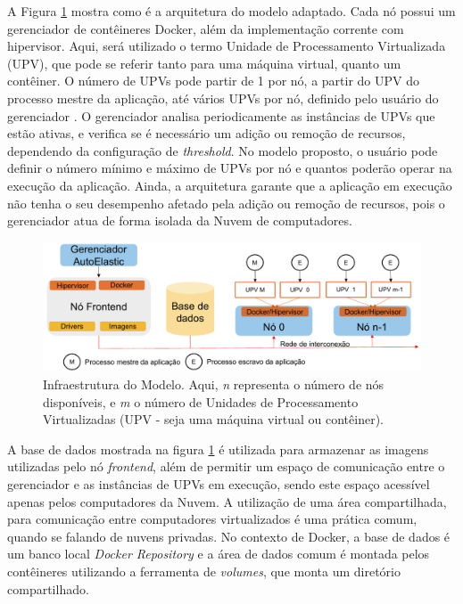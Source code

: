 \documentclass[twoside,english,brazilian]{UNISINOSartigo}
\begin{document}
A Figura \ref{fig:arquitetura} mostra como é a arquitetura do modelo adaptado. Cada nó possui um gerenciador de contêineres Docker, além da implementação corrente com hipervisor. Aqui, será utilizado o termo Unidade de Processamento Virtualizada (UPV), que pode se referir tanto para uma máquina virtual, quanto um contêiner. O número de UPVs pode partir de 1 por nó, a partir do UPV do processo mestre da aplicação, até vários UPVs por nó, definido pelo usuário do gerenciador \cite{6307065}. O gerenciador analisa periodicamente as instâncias de UPVs que estão ativas, e verifica se é necessário um adição ou remoção de recursos, dependendo da configuração de \textit{threshold}. No modelo proposto, o usuário pode definir o número mínimo e máximo de UPVs por nó e quantos poderão operar na execução da aplicação. Ainda, a arquitetura garante que a aplicação em execução não tenha o seu desempenho afetado pela adição ou remoção de recursos, pois o gerenciador atua de forma isolada da Nuvem de computadores. 
\begin{figure}[ht!]
	\caption{Infraestrutura do Modelo. Aqui, \textit{n} representa o número de nós disponíveis, e \textit{m} o número de Unidades de Processamento Virtualizadas (UPV - seja uma máquina virtual ou contêiner).}
	\label{fig:arquitetura}
	\centering%
	\begin{minipage}{0.8\textwidth}
		\includegraphics[width=\textwidth]{images/arquitetura}
	\end{minipage}
\end{figure}
A base de dados mostrada na figura \ref{fig:arquitetura} é utilizada para armazenar as imagens utilizadas pelo nó \textit{frontend}, além de permitir um espaço de comunicação entre o gerenciador e as instâncias de UPVs em execução, sendo este espaço acessível apenas pelos computadores da Nuvem. A utilização de uma área compartilhada, para comunicação entre computadores virtualizados é uma prática comum, quando se falando de nuvens privadas. No contexto de Docker, a base de dados é um banco local \textit{Docker Repository} e a área de dados comum é montada pelos contêineres utilizando a ferramenta de \textit{volumes}, que monta um diretório compartilhado.
\end{document}
